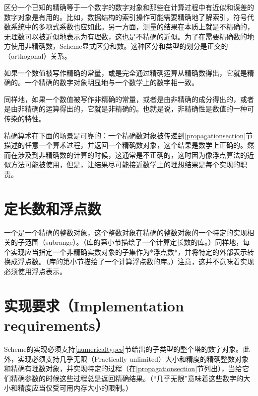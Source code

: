 区分一个已知的精确等于一个数字的数字对象和那些在计算过程中有近似和误差的数字对象是有用的。比如，数据结构的索引操作可能需要精确地了解索引，符号代数系统中的多项式系数也应如此。另一方面，测量的结果在本质上就是不精确的，无理数可以被近似地表示为有理数，这也是不精确的近似。为了在需要精确数的地方使用非精确数，Scheme显式区分和数。这种区分和类型的划分是正交的（orthogonal）关系。

如果一个数值被写作精确的常量，或是完全通过精确运算从精确数得出，它就是精确的。一个精确的数字对象明显地与一个数学上的数字相一致。

同样地，如果一个数值被写作非精确的常量，或者是由非精确的成分得出的，或者是由非精确的运算得出的，它就是非精确的。也就是说，非精确性是数值的一种可传染的特性。

精确算术在下面的场景是可靠的：一个精确数对象被传递到\ref{propagationsection}节描述的任意一个算术过程，并返回一个精确数对象，这个结果是数学上正确的。然而在涉及到非精确数的计算的时候，这通常是不正确的，这时因为像浮点算法的近似方法可能被使用，但是，让结果尽可能接近数学上的理想结果是每个实现的职责。

\section{定长数和浮点数}

一个是一个精确的整数对象，这个整数对象在精确的整数对象的一个特定的实现相关的子范围（subrange）。（库的第小节描绘了一个计算定长数的库。）同样地，每个实现应当指定一个非精确实数对象的子集作为*浮点数*，并将特定的外部表示转换成浮点数。（库的第小节描绘了一个计算浮点数的库。）注意，这并不意味着实现必须使用浮点表示。

\section{实现要求（Implementation requirements）}

\label{restrictions}

Scheme的实现必须支持\ref{numericaltypes}节给出的子类型的整个塔的数字对象。此外，实现必须支持几乎无限（Practically unlimited）大小和精度的精确整数对象和精确有理数对象，并实现特定的过程（在\ref{propagationsection}节列出），当给它们精确参数的时候这些过程总是返回精确结果。（“几乎无限”意味着这些数字的大小和精度应当仅受可用内存大小的限制。）

